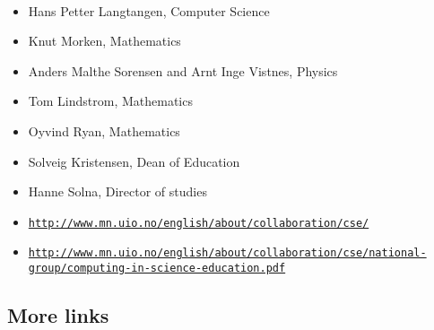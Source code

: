 \documentclass[%
twoside,                 %
final,                   %
10pt]{article}
\begin{document}
\paragraph{}
\begin{itemize}
\item Hans Petter Langtangen, Computer Science

\item Knut Morken, Mathematics

\item Anders Malthe Sorensen and Arnt Inge Vistnes, Physics

\item Tom Lindstrom, Mathematics

\item Oyvind Ryan, Mathematics

\item Solveig Kristensen, Dean of Education

\item Hanne Solna, Director of studies

\item \href{{http://www.mn.uio.no/english/about/collaboration/cse/}}{\nolinkurl{http://www.mn.uio.no/english/about/collaboration/cse/}}

\item \href{{http://www.mn.uio.no/english/about/collaboration/cse/national-group/computing-in-science-education.pdf}}{\nolinkurl{http://www.mn.uio.no/english/about/collaboration/cse/national-group/computing-in-science-education.pdf}}
\end{itemize}

\noindent




\subsection*{More links}

\end{document}
